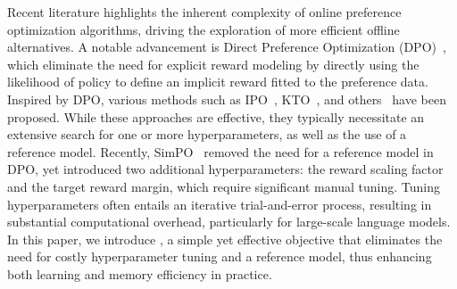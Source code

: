 Recent literature highlights the inherent complexity of online preference optimization algorithms, driving the exploration of more efficient offline alternatives. A notable advancement is Direct Preference Optimization (DPO)~\citep{rafailov2024direct}, which 
eliminate the need for explicit reward modeling by directly using the likelihood of policy to define an implicit reward fitted  to the preference data. Inspired by DPO, various methods such as IPO~\citep{azar2024general}, KTO~\citep{ethayarajh2024kto}, and others~\citep{yuan2024rrhf,xucontrastive,hong2024orpo,xiao2024Cal,xiao2024leverage} have been proposed. While these approaches are effective, they typically necessitate an extensive search for one or more hyperparameters, as well as the use of a reference model. Recently, SimPO~\citep{meng2024simpo} removed the need for a reference model in DPO, yet introduced two additional hyperparameters: the reward scaling factor and the target reward margin, which require significant manual tuning. Tuning hyperparameters often entails an iterative trial-and-error process, resulting in substantial computational overhead, particularly for large-scale language models. In this paper, we introduce \method, a simple yet effective objective that eliminates the need for costly hyperparameter tuning and a reference model, thus enhancing both learning and memory efficiency in practice. 





